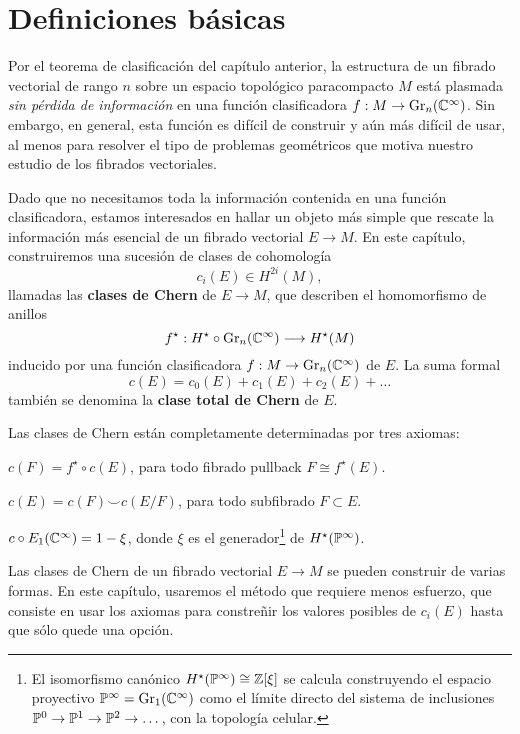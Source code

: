 \section{Definiciones básicas}

Por el teorema de clasificación del capítulo anterior, la estructura de un fibrado vectorial de rango $n$ sobre un espacio topológico paracompacto $M$ está plasmada \textit{sin pérdida de información} en una función clasificadora $f : M \to \Gr_n(\C^\infty)$. Sin embargo, en general, esta función es difícil de construir y aún más difícil de usar, al menos para resolver el tipo de problemas geométricos que motiva nuestro estudio de los fibrados vectoriales.

Dado que no necesitamos toda la información contenida en una función clasificadora, estamos interesados en hallar un objeto más simple que rescate la información más esencial de un fibrado vectorial $E \to M$. En este capítulo, construiremos una sucesión de clases de cohomología
$$c_i(E) \in H^{2i}(M),$$
llamadas las \textbf{clases de Chern} de $E \to M$, que describen el homomorfismo de anillos
$$f^\star : H^\star \circ \Gr_n(\C^\infty) \longrightarrow H^\star(M)$$
inducido por una función clasificadora $f : M \to \Gr_n(\C^\infty)$ de $E$. La suma formal
$$c(E) = c_0(E) + c_1(E) + c_2(E) + \dots$$
también se denomina la \textbf{clase total de Chern} de $E$.

Las clases de Chern están completamente determinadas por tres axiomas:

\begin{axiom}[Naturalidad]
$c(F) = f^\star \circ c(E)$, para todo fibrado pullback $F \cong f^\star(E)$.
\end{axiom}

\begin{axiom}
$c(E) = c(F) \smile c(E/F)$, para todo subfibrado $F \subset E$.
\end{axiom}

\begin{axiom}[Normalización]
$c \circ E_1(\C^\infty) = 1 - \xi$, donde $\xi$ es el generador\footnote{El isomorfismo canónico $H^\star(\P^\infty) \cong \Z[\xi]$ se calcula construyendo el espacio proyectivo $\P^\infty = \Gr_1(\C^\infty)$ como el límite directo del sistema de inclusiones $\P^0 \to \P^1 \to \P^2 \to \dots$, con la topología celular.} de $H^\star(\P^\infty)$.
\end{axiom}

Las clases de Chern de un fibrado vectorial $E \to M$ se pueden construir de varias formas. En este capítulo, usaremos el método que requiere menos esfuerzo, que consiste en usar los axiomas para constreñir los valores posibles de $c_i(E)$ hasta que sólo quede una opción.

